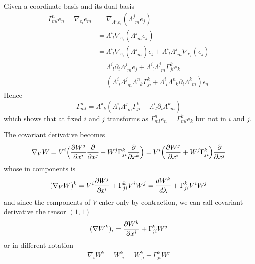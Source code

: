     Given a coordinate basis and its dual basis 
    \begin{equation*}
    \begin{aligned}
        \Gamma^n_{ml} e_n = \nabla_{e_l} e_m &= \nabla_{\Lambda^i_{\phantom i l} e_i} (\Lambda^j_{\phantom j m} e_j) \\ & = \Lambda^i_{\phantom i l} \nabla_{e_i} (\Lambda^j_{\phantom j m} e_j) \\ & = \Lambda^i_{\phantom i l} \nabla_{e_i} (\Lambda^j_{\phantom j m}) e_j + \Lambda^i_{\phantom i l} \Lambda^j_{\phantom j m} \nabla_{e_i} (e_j) \\ & = \Lambda^i_{\phantom i l} \partial_i \Lambda^j_{\phantom j m} e_j + \Lambda^i_{\phantom i l} \Lambda^j_{\phantom j m} \Gamma^k_{ji} e_k \\ & = (\Lambda^i_{\phantom i l} \Lambda^j_{\phantom j m} \Lambda^n_{\phantom n k} \Gamma^k_{ji}+ \Lambda^i_{\phantom i l} \Lambda^n_{\phantom n k} \partial_i \Lambda^k_{\phantom k m}) e_n
    \end{aligned}
    \end{equation*}
    Hence
    \begin{equation*}
        \Gamma^n_{ml} = \Lambda^n_{\phantom n k} (\Lambda^i_{\phantom i l} \Lambda^j_{\phantom j m}  \Gamma^k_{ji} + \Lambda^i_{\phantom i l} \partial_i \Lambda^k_{\phantom k m})
    \end{equation*}
    which shows that at fixed $i$ and $j$ transforms as $\Gamma^n_{ml} e_n = \Gamma^k_{ml} e_k$ but not in $i$ and $j$.

    The covariant derivative becomes 
    \begin{equation*}
        \nabla_V W = V^i \Big (\frac{\partial W^j}{\partial x^i} \frac{\partial}{\partial x^j} + W^j \Gamma^k_{ji} \frac{\partial}{\partial x^k} \Big) = V^i \Big (\frac{\partial W^j}{\partial x^i} + W^j \Gamma^k_{ji} \Big) \frac{\partial}{\partial x^j}
    \end{equation*}
    whose in components is 
    \begin{equation*}
        (\nabla_V W)^k = V^i \frac{\partial W^j}{\partial x^i} + \Gamma^k_{ji} V^i W^j = \frac{dW^k}{d\lambda} + \Gamma^k_{ji} V^i W^j
    \end{equation*}
    and since the components of $V$ enter only by contraction, we can call covariant derivative the tensor $(1,1)$ 
    \begin{equation*}
        (\nabla W^k)_i = \frac{\partial W^k}{\partial x^i} + \Gamma^k_{ji} W^j
    \end{equation*}
    or in different notation 
    \begin{equation*}
        \nabla_i W^k = W^k_{;i} = W^k_{,i} + \Gamma^k_{ji} W^j
    \end{equation*}

